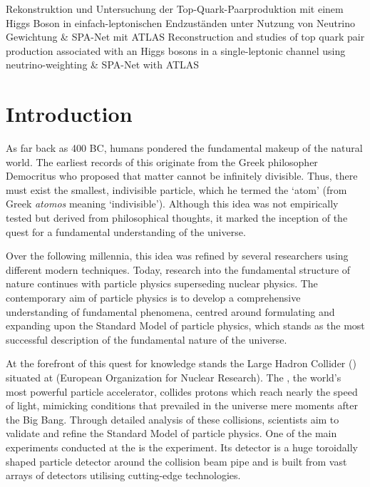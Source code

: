 \documentclass[bachelor,ngerman,english]{GAUBM}
\begin{document}
	
\ThesisTitle%
    {Rekonstruktion und Untersuchung der Top-Quark-Paarproduktion mit einem Higgs Boson in einfach-leptonischen Endzuständen unter Nutzung von Neutrino Gewichtung \& SPA-Net mit ATLAS}%
    {Reconstruction and studies of top quark pair production associated with an Higgs bosons in a single-leptonic channel using neutrino-weighting \& SPA-Net with ATLAS}

\frontmatter
\maketitle
\cleardoublepage
\onehalfspacing
\tableofcontents
\mainmatter

\chapter{Introduction}
\label{ch:introduction}
As far back as 400 BC, humans pondered the fundamental makeup of the natural world. The earliest records of this originate from the Greek philosopher Democritus who proposed that matter cannot be infinitely divisible. Thus, there must exist the smallest, indivisible particle, which he termed the `atom' (from Greek \textit{atomos} meaning `indivisible'). Although this idea was not empirically tested but derived from philosophical thoughts, it marked the inception of the quest for a fundamental understanding of the universe.

Over the following millennia, this idea was refined by several researchers using different modern techniques. Today, research into the fundamental structure of nature continues with particle physics superseding nuclear physics. The contemporary aim of particle physics is to develop a comprehensive understanding of fundamental phenomena, centred around formulating and expanding upon the Standard Model of particle physics, which stands as the most successful description of the fundamental nature of the universe.

At the forefront of this quest for knowledge stands the Large Hadron Collider (\lhc) situated at \cern (European Organization for Nuclear Research). The \lhc, the world's most powerful particle accelerator, collides protons which reach nearly the speed of light, mimicking conditions that prevailed in the universe mere moments after the Big Bang. Through detailed analysis of these collisions, scientists aim to validate and refine the Standard Model of particle physics. One of the main experiments conducted at the \lhc is the \atlas experiment. Its detector is a huge toroidally shaped particle detector around the collision beam pipe and is built from vast arrays of detectors utilising cutting-edge technologies.
\end{document}
